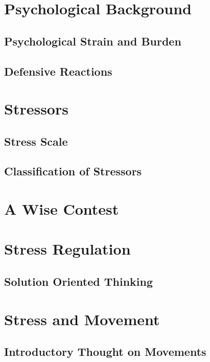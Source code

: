 \documentclass[../main.tex]{subfiles}
\begin{document}
\section{Psychological Background}
\subsection{Psychological Strain and Burden}


\subsection{Defensive Reactions}



\section{Stressors}
\subsection{Stress Scale}


\subsection{Classification of Stressors}
% 

\section{A Wise Contest}


\section{Stress Regulation}
\subsection{Solution Oriented Thinking}


\section{Stress and Movement}
\subsection{Introductory Thought on Movements}

\end{document}
